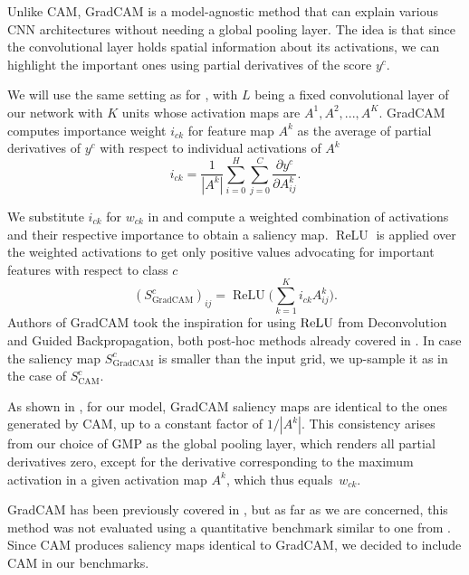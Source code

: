 Unlike CAM, GradCAM \cite{grad-cam} is a model-agnostic method that can explain various CNN architectures without needing a global pooling layer.
The idea is that since the convolutional layer holds spatial information about its activations, we can highlight the important ones using partial derivatives of the score $y^c$.

We will use the same setting as for , with $L$ being a fixed convolutional layer of our network with $K$ units whose activation maps are $A^1, A^2, ..., A^K$.
GradCAM computes importance weight $i_{ck}$ for feature map $A^k$ as the average of partial derivatives of $y^c$ with respect to individual activations of $A^k$ \cite{grad-cam}
\begin{equation}\label{grad-cam-weights}
    i_{ck} = \frac{1}{|A^k|} \sum_{i=0}^H \sum_{j=0}^C \frac{\partial y^c}{\partial A^k_{ij}}.
\end{equation}

We substitute $i_{ck}$ for $w_{ck}$ in  and compute a weighted combination of activations and their respective importance to obtain a saliency map.
$\operatorname{ReLU}$ is applied over the weighted activations to get only positive values advocating for important features with respect to class $c$ \cite{grad-cam}
\begin{equation}\label{eq:gradcam-saliency-map}
    (S^c_{\text{GradCAM}})_{ij} = \operatorname{ReLU}\biggl(\sum_{k=1}^K i_{ck} A^k_{ij}\biggr).
\end{equation}
Authors of GradCAM took the inspiration for using $\operatorname{ReLU}$ from Deconvolution and Guided Backpropagation, both post-hoc methods already covered in \cite{gallo}.
In case the saliency map $S^c_{\text{GradCAM}}$ is smaller than the input grid, we up-sample it as in the case of $S^c_{\text{CAM}}$.

As shown in \cite{bajger-grad-cam}, for our model, GradCAM saliency maps are identical to the ones generated by CAM, up to a constant factor of ${1}/{|A^k|}$.
This consistency arises from our choice of GMP as the global pooling layer, which renders all partial derivatives zero, except for the derivative corresponding to the maximum activation in a given activation map $A^k$, which thus equals~$w_{ck}$.

GradCAM has been previously covered in \cite{hruska-grad-cam, krajnansky-grad-cam, bajger-grad-cam}, but as far as we are concerned, this method was not evaluated using a quantitative benchmark similar to one from \cite{gallo}.
Since CAM produces saliency maps identical to GradCAM, we decided to include CAM in our benchmarks.

